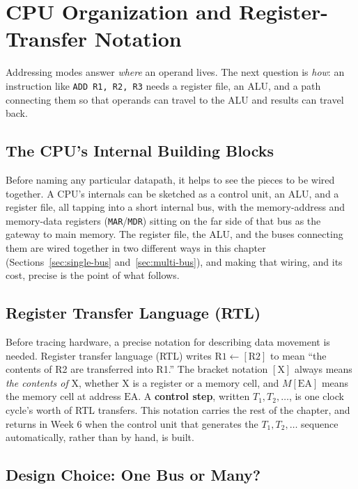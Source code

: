 \documentclass[11pt]{article}
\begin{document}
\section{CPU Organization and Register-Transfer Notation}

Addressing modes answer \emph{where} an operand lives. The next question is \emph{how}: an instruction like \texttt{ADD R1, R2, R3} needs a register file, an ALU, and a path connecting them so that operands can travel to the ALU and results can travel back.

\subsection{The CPU's Internal Building Blocks}

Before naming any particular datapath, it helps to see the pieces to be wired together. A CPU's internals can be sketched as a control unit, an ALU, and a register file, all tapping into a short internal bus, with the memory-address and memory-data registers (\texttt{MAR}/\texttt{MDR}) sitting on the far side of that bus as the gateway to main memory. The register file, the ALU, and the buses connecting them are wired together in two different ways in this chapter (Sections~\ref{sec:single-bus} and~\ref{sec:multi-bus}), and making that wiring, and its cost, precise is the point of what follows.

\subsection{Register Transfer Language (RTL)}

Before tracing hardware, a precise notation for describing data movement is needed. Register transfer language (RTL) writes $\text{R1} \gets [\text{R2}]$ to mean ``the contents of R2 are transferred into R1.'' The bracket notation $[\text{X}]$ always means \emph{the contents of} X, whether X is a register or a memory cell, and $M[\text{EA}]$ means the memory cell at address $\text{EA}$. A \textbf{control step}, written $T_1, T_2, \dots$, is one clock cycle's worth of RTL transfers. This notation carries the rest of the chapter, and returns in Week 6 when the control unit that generates the $T_1, T_2, \dots$ sequence automatically, rather than by hand, is built.

\subsection{Design Choice: One Bus or Many?}
\end{document}
